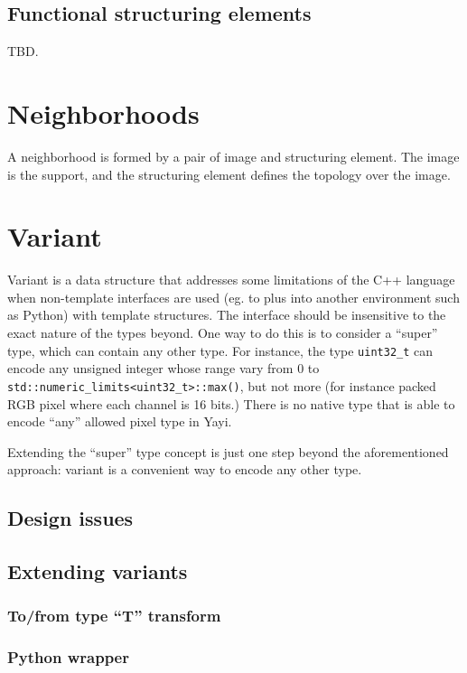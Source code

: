 \section{Functional structuring elements}
TBD.


\chapter{Neighborhoods}
\label{chap:neighborhood}
A neighborhood is formed by a pair of image and structuring element. The image is the support, and the structuring element defines the topology over the image. 


\chapter{Variant}
\label{variant}

Variant is a data structure that addresses some limitations of the C++ language when non-template interfaces are used (eg. to plus into another environment such as Python) with template structures. The interface should be insensitive to the exact nature of the types beyond. One way to do this is to consider a ``super'' type, which can contain any other type. For instance, the type \lstinline|uint32_t| can encode any unsigned integer whose range vary from 0 to \lstinline|std::numeric_limits<uint32_t>::max()|, but not more (for instance packed RGB pixel where each channel is 16 bits.) There is no native type that is able to encode ``any'' allowed pixel type in Yayi.  

Extending the ``super'' type concept is just one step beyond the aforementioned approach: variant is a convenient way to encode any other type. 

\section{Design issues}


\section{Extending variants}

\subsection{To/from type ``T'' transform}

\subsection{Python wrapper}

